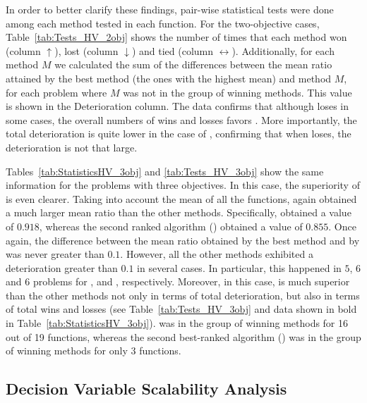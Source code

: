 


In order to better clarify these findings, pair-wise statistical tests were done among each method tested in each
function.
%
For the two-objective cases, Table~\ref{tab:Tests_HV_2obj} shows the number of times that each method won (column $\uparrow$),
lost (column $\downarrow$) and tied (column $\leftrightarrow$).
%
Additionally, for each method $M$ we calculated the sum of the differences between the mean \HV{} ratio attained by the best method 
(the ones with the highest mean) and method $M$, for each problem where $M$ was not in the group of winning methods.
%
This value is shown in the Deterioration column.
%
The data confirms that although \VSDMOEA{} loses in some cases, the overall numbers of wins and losses
favors \VSDMOEA{}.
%
More importantly, the total deterioration is quite lower in the case of \VSDMOEA{}, confirming that when \VSDMOEA{} loses, the deterioration is not 
that large.


Tables~\ref{tab:StatisticsHV_3obj} and \ref{tab:Tests_HV_3obj} show the same information for the problems with three objectives.
%
In this case, the superiority of \VSDMOEA{} is even clearer.
%
Taking into account the mean of all the functions, \VSDMOEA{} again obtained a much larger mean \HV{} ratio than the other methods.
%
Specifically, \VSDMOEA{} obtained a value of $0.918$, whereas the second ranked algorithm (\RMOEA{}) obtained a value of $0.855$.
%
Once again, the difference between the mean \HV{} ratio obtained by the best method and by \VSDMOEA{} was never greater
than $0.1$.
%
However, all the other methods exhibited a deterioration greater than $0.1$ in several cases.
%
In particular, this happened in $5$, $6$ and $6$ problems for \RMOEA{}, \NSGAII{} and \MOEAD{}, respectively.
%
Moreover, in this case, \VSDMOEA{} is much superior than the other methods not only in terms of total deterioration, but also
in terms of total wins and losses  (see Table~\ref{tab:Tests_HV_3obj} and data shown in bold in Table~\ref{tab:StatisticsHV_3obj}).
%
\VSDMOEA{} was in the group of winning methods for 16 out of 19 functions, whereas the second best-ranked algorithm (\RMOEA{})
was in the group of winning methods for only 3 functions.

\subsection{Decision Variable Scalability Analysis}

